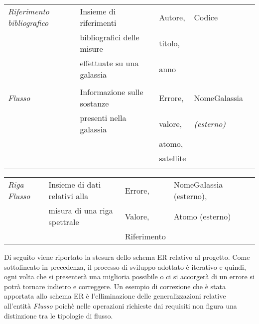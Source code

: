 \documentclass[12pt,a4paper,onecolumn,x11names]{article}
\begin{document}
\begin{table}[h!]
\begin{tabular}{lllll}
				\textit{Riferimento bibliografico}	& Insieme di riferimenti  & Autore,		&	Codice				\\
					& bibliografici delle misure  & titolo,		&					\\
				&effettuate su una galassia & anno		&					\\
				&						&				&					\\
				\textit{Flusso}			& Informazione sulle sostanze & Errore, 		& NomeGalassia \\
				& presenti nella galassia	&	valore,		& \textit{(esterno)}\\
				&							& atomo,		&					\\
				&							& satellite	&						\\
				&							&			&						\\
			\end{tabular}
		\end{table}
			
		\begin{table}
		\centering
			\begin{tabular}{lllll}
			\textit{Riga Flusso}	& Insieme di dati relativi alla  & Errore, & NomeGalassia (esterno),\\
			& misura di una riga spettrale & Valore,		&		Atomo (esterno)	\\
			&  & Riferimento		&				\\ 
			\end{tabular}
		\end{table}
	
		\begin{flushleft}
			Di seguito viene riportato la stesura dello schema ER relativo al progetto. Come sottolineato in precedenza, il processo di sviluppo adottato è iterativo e quindi, ogni volta che si presenterà una miglioria possibile o ci si accorgerà di un errore si potrà tornare indietro e correggere.\newline
			Un esempio di correzione che è stata apportata allo schema ER è l'elliminazione delle generalizzazioni relative all'entità \textit{Flusso} poichè nelle operazioni richieste dai requisiti non figura una distinzione tra le tipologie di flusso.
		\end{flushleft}
\end{document}
